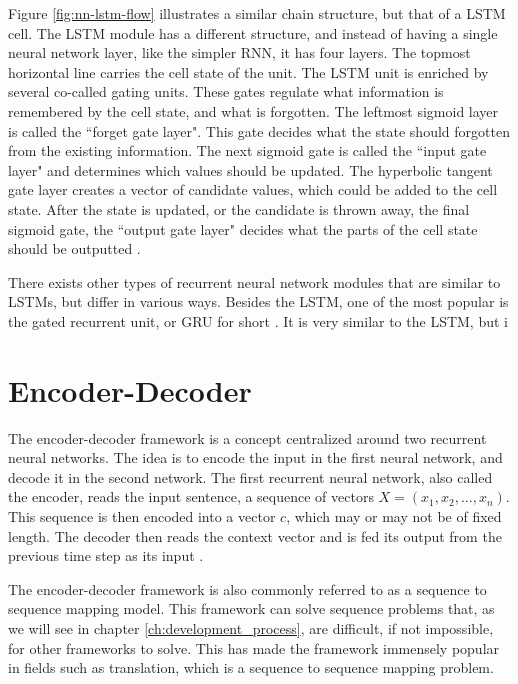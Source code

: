 Figure \ref{fig:nn-lstm-flow} illustrates a similar chain structure, but that of a LSTM cell. The LSTM module has a different structure, and instead of having a single neural network layer, like the simpler RNN, it has four layers. The topmost horizontal line carries the cell state of the unit. The LSTM unit is enriched by several co-called gating units. These gates regulate what information is remembered by the cell state, and what is forgotten. The leftmost sigmoid layer is called the ``forget gate layer". This gate decides what the state should forgotten from the existing information. The next sigmoid gate is called the ``input gate layer" and determines which values should be updated. The hyperbolic tangent gate layer creates a vector of candidate values, which could be added to the cell state. After the state is updated, or the candidate is thrown away, the final sigmoid gate, the ``output gate layer" decides what the parts of the cell state should be outputted \citep{hochreiter1997long, goodfellow2016deeplearning, olah2015lstm, gers2002learning}.

There exists other types of recurrent neural network modules that are similar to LSTMs, but differ in various ways. Besides the LSTM, one of the most popular is the gated recurrent unit, or GRU for short \citep{chung2014empirical}. It is very similar to the LSTM, but i


\section{Encoder-Decoder}
\label{sec:encoder-decoder}
The encoder-decoder framework is a concept centralized around two recurrent neural networks. The idea is to encode the input in the first neural network, and decode it in the second network. The first recurrent neural network, also called the encoder, reads the input sentence, a sequence of vectors \(X = (x_{1}, x_{2}, \ldots, x_{n})\). This sequence is then encoded into a vector \(c\), which may or may not be of fixed length. The decoder then reads the context vector and is fed its output from the previous time step as its input \citep{sutskever2014sequence}.

The encoder-decoder framework is also commonly referred to as a sequence to sequence mapping model. This framework can solve sequence problems that, as we will see in chapter \ref{ch:development_process}, are difficult, if not impossible, for other frameworks to solve. This has made the framework immensely popular in fields such as translation, which is a sequence to sequence mapping problem.